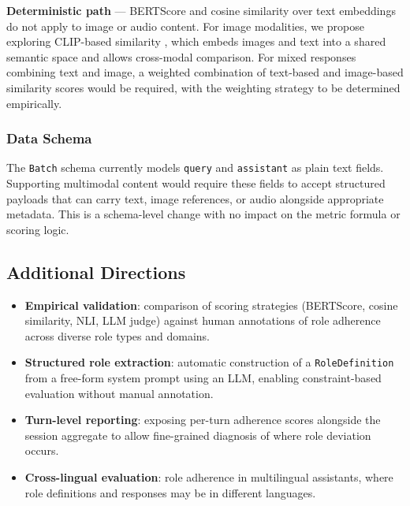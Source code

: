 \documentclass[11pt,a4paper]{article}
\begin{document}
\textbf{Deterministic path} --- BERTScore and cosine similarity over text
embeddings do not apply to image or audio content. For image modalities, we
propose exploring CLIP-based similarity \citep{radford2021clip}, which embeds
images and text into a shared semantic space and allows cross-modal comparison.
For mixed responses combining text and image, a weighted combination of
text-based and image-based similarity scores would be required, with the
weighting strategy to be determined empirically.

\subsubsection{Data Schema}

The \texttt{Batch} schema currently models \texttt{query} and
\texttt{assistant} as plain text fields. Supporting multimodal content would
require these fields to accept structured payloads that can carry text, image
references, or audio alongside appropriate metadata. This is a schema-level
change with no impact on the metric formula or scoring logic.

\subsection{Additional Directions}

\begin{itemize}
  \item \textbf{Empirical validation}: comparison of scoring strategies
        (BERTScore, cosine similarity, NLI, LLM judge) against human
        annotations of role adherence across diverse role types and domains.

  \item \textbf{Structured role extraction}: automatic construction of a
        \texttt{RoleDefinition} from a free-form system prompt using an LLM,
        enabling constraint-based evaluation without manual annotation.

  \item \textbf{Turn-level reporting}: exposing per-turn adherence scores
        alongside the session aggregate to allow fine-grained diagnosis of
        where role deviation occurs.

  \item \textbf{Cross-lingual evaluation}: role adherence in multilingual
        assistants, where role definitions and responses may be in different
        languages.
\end{itemize}
\end{document}
